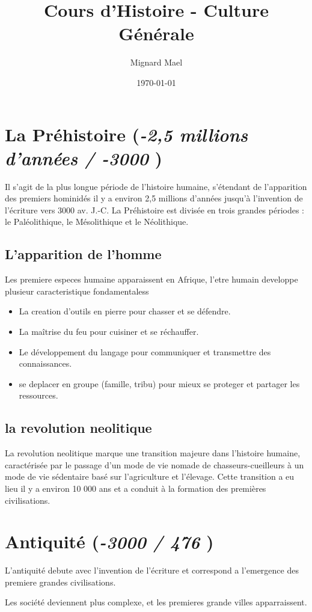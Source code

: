 \documentclass[a4paper,12pt]{article}
\title{\textbf{Cours d'Histoire - Culture Générale}}
\author{Mignard Mael}
\date{\today}
\begin{document}
\maketitle

\section{La Préhistoire (\textit{-2,5 millions d'années / -3000 })}
Il s'agit de la plus longue période de l'histoire humaine, s'étendant de l'apparition des premiers hominidés il y a environ 2,5 millions d'années jusqu'à l'invention de l'écriture vers 3000 av. J.-C. La Préhistoire est divisée en trois grandes périodes : le Paléolithique, le Mésolithique et le Néolithique.
\subsection{L'apparition de l'homme}
Les premiere especes humaine apparaissent en Afrique, l'etre humain developpe plusieur caracteristique fondamentaless
\begin{itemize}
    \item  La creation d'outils en pierre pour chasser et se défendre.
    \item La maîtrise du feu pour cuisiner et se réchauffer.
    \item Le développement du langage pour communiquer et transmettre des connaissances.
    \item se deplacer en groupe (famille, tribu) pour mieux se proteger et partager les ressources.
\end{itemize}
\subsection{la revolution neolitique}
La revolution neolitique marque une transition majeure dans l'histoire humaine, caractérisée par le passage d'un mode de vie nomade de chasseurs-cueilleurs à un mode de vie sédentaire basé sur l'agriculture et l'élevage. Cette transition a eu lieu il y a environ 10 000 ans et a conduit à la formation des premières civilisations.

\section{Antiquité (\textit{-3000 / 476} )}
L'antiquité debute avec l'invention de l'écriture et correspond a l'emergence des premiere grandes civilisations.

Les société deviennent plus complexe, et les premieres grande villes apparraissent.
\end{document}
